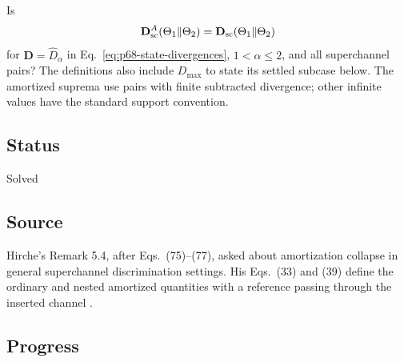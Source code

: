 Is
\begin{equation}
  \mathbf D_{\rm sc}^{A}(\Theta_1\|\Theta_2)
  =\mathbf D_{\rm sc}(\Theta_1\|\Theta_2)
  \label{eq:p68-superchannel-collapse}
\end{equation}
for $\mathbf D=\widehat D_\alpha$ in Eq.~\eqref{eq:p68-state-divergences},
$1<\alpha\leq2$, and all superchannel pairs? The definitions also include $D_{\max}$ to state its settled
subcase below. The amortized suprema use pairs with finite subtracted
divergence; other infinite values have the standard support convention.

\subsection*{Status}

Solved

\subsection*{Source}

Hirche's Remark 5.4, after Eqs.~(75)--(77), asked about amortization
collapse in general superchannel discrimination settings. His
Eqs.~(33) and (39) define the ordinary and nested amortized quantities
with a reference passing through the inserted channel
.

\subsection*{Progress}

